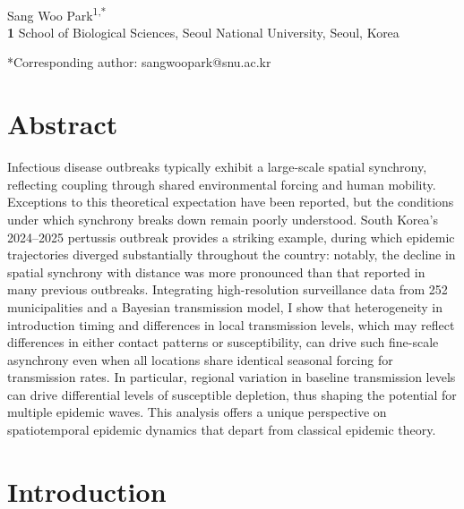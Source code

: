 \documentclass[12pt]{article}
\date{\today}
\begin{document}
\begin{flushleft}{
	\Large
	\textbf{}
}
\newline
\\
Sang Woo Park\textsuperscript{1,*}
\\
\bigskip
\textbf{1} School of Biological Sciences, Seoul National University, Seoul, Korea
\bigskip

*Corresponding author: sangwoopark@snu.ac.kr
\end{flushleft}

\section*{Abstract}

Infectious disease outbreaks typically exhibit a large-scale spatial synchrony, reflecting coupling through shared environmental forcing and human mobility.
Exceptions to this theoretical expectation have been reported, but the conditions under which synchrony breaks down remain poorly understood.
South Korea’s 2024–2025 pertussis outbreak provides a striking example, during which epidemic trajectories diverged substantially throughout the country:
notably, the decline in spatial synchrony with distance was more pronounced than that reported in many previous outbreaks.
Integrating high-resolution surveillance data from 252 municipalities and a Bayesian transmission model, I show that heterogeneity in introduction timing and differences in local transmission levels, which may reflect differences in either contact patterns or susceptibility, can drive such fine-scale asynchrony even when all locations share identical seasonal forcing for transmission rates.
In particular, regional variation in baseline transmission levels can drive differential levels of susceptible depletion, thus shaping the potential for multiple epidemic waves.
This analysis offers a unique perspective on spatiotemporal epidemic dynamics that depart from classical epidemic theory.

\pagebreak

\section*{Introduction}
\end{document}

